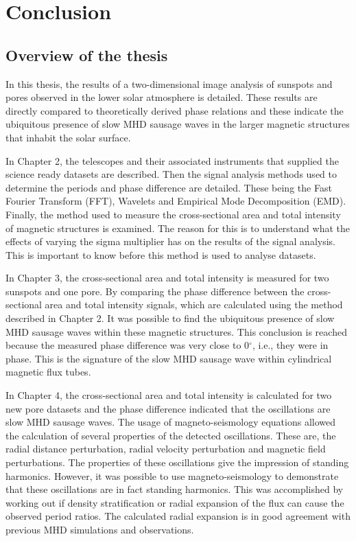\graphicspath{{Chapter6/Figs/}}

\chapter{Conclusion}
    
    \vspace*{\fill}\par
    \pagebreak

\section{Overview of the thesis}
    
	In this thesis, the results of a two-dimensional image analysis of sunspots and pores observed in the lower solar atmosphere is detailed.
    These results are directly compared to theoretically derived phase relations and these indicate the ubiquitous presence of slow MHD sausage waves in the larger magnetic structures that inhabit the solar surface.
    
    In Chapter 2, the telescopes and their associated instruments that supplied the science ready datasets are described.
    Then the signal analysis methods used to determine the periods and phase difference are detailed.
    These being the Fast Fourier Transform (FFT), Wavelets and Empirical Mode Decomposition (EMD).
    Finally, the method used to measure the cross-sectional area and total intensity of magnetic structures is examined.
    The reason for this is to understand what the effects of varying the sigma multiplier has on the results of the signal analysis.
    This is important to know before this method is used to analyse datasets.
    
    In Chapter 3, the cross-sectional area and total intensity is measured for two sunspots and one pore.
    By comparing the phase difference between the cross-sectional area and total intensity signals, which are calculated using the method described in Chapter 2.
    It was possible to find the ubiquitous presence of slow MHD sausage waves within these magnetic structures.
    This conclusion is reached because the measured phase difference was very close to 0$^\circ$, i.e., they were in phase.
    This is the signature of the slow MHD sausage wave within cylindrical magnetic flux tubes.
    
    In Chapter 4, the cross-sectional area and total intensity is calculated for two new pore datasets and the phase difference indicated that the oscillations are slow MHD sausage waves.
    The usage of magneto-seismology equations allowed the calculation of several properties of the detected oscillations.
    These are, the radial distance perturbation, radial velocity perturbation and magnetic field perturbations.
    The properties of these oscillations give the impression of standing harmonics.
    However, it was possible to use magneto-seismology to demonstrate that these oscillations are in fact standing harmonics.
    This was accomplished by working out if density stratification or radial expansion of the flux can cause the observed period ratios.
    The calculated radial expansion is in good agreement with previous MHD simulations and observations. 
    
